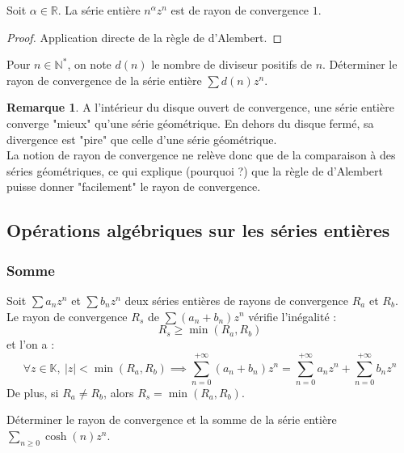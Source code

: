 \documentclass[french]{article}
\newcommand{\N}{\mathbb{N}}
\newcommand{\R}{\mathbb{R}}
\newcommand{\K}{\mathbb{K}}
\newcommand{\st}{^*}
\theoremstyle{plain}
\theoremstyle{definition}
\newtheorem*{rmq}{Remarque}
\theoremstyle{remark}
\begin{document}
\begin{prop}
	Soit $\alpha\in\R$. La série entière $\displaystyle n^\alpha z^n$ est de rayon de convergence $1$.
\end{prop}
\begin{proof}
	Application directe de la règle de d'Alembert.
\end{proof}

\begin{exo}
	Pour $n\in\N\st$, on note $d(n)$ le nombre de diviseur positifs de $n$. Déterminer le rayon de convergence de la série entière $\displaystyle\sum d(n)z^n$.
\end{exo}

\begin{rmq}
	A l'intérieur du disque ouvert de convergence, une série entière converge "mieux" qu'une série géométrique. En dehors du disque fermé, sa divergence est "pire" que celle d'une série géométrique. \\
	La notion de rayon de convergence ne relève donc que de la comparaison à des séries géométriques, ce qui explique (pourquoi ?) que la règle de d'Alembert puisse donner "facilement" le rayon de convergence.
\end{rmq}

\subsection{Opérations algébriques sur les séries entières}

\subsubsection*{Somme}

\begin{prop}%
	Soit $\displaystyle\sum a_nz^n$ et $\displaystyle\sum b_nz^n$ deux séries entières de rayons de convergence $R_a$ et $R_b$. \\
	Le rayon de convergence $R_s$ de $\displaystyle\sum (a_n+b_n)z^n$ vérifie l'inégalité : $$R_s\geqslant\min(R_a,R_b)$$ et l'on a : $$\forall z\in\K,\ \lvert z\rvert<\min(R_a,R_b)\implies\sum_{n=0}^{+\infty}(a_n+b_n)z^n=\sum_{n=0}^{+\infty}a_nz^n+\sum_{n=0}^{+\infty}b_nz^n$$ De plus, si $R_a\ne R_b$, alors $R_s=\min(R_a,R_b)$.
\end{prop}

\begin{exo}
	Déterminer le rayon de convergence et la somme de la série entière $\displaystyle\sum_{n\geqslant 0}\cosh(n)z^n$.
\end{exo}
\end{document}
